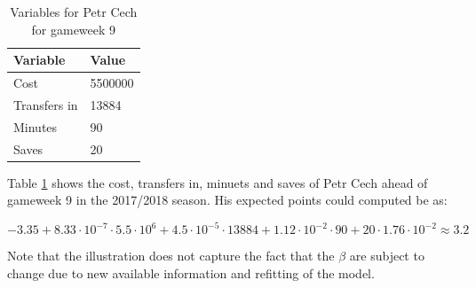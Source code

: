 \begin{table}[H]
\centering
\begin{tabular}{|l|l|}
\hline
Variable     & Value   \\ \hline
Cost         & 5500000 \\
Transfers in & 13884   \\
Minutes      & 90      \\
Saves        & 20     \\
\hline
\end{tabular}
\caption{Variables for Petr Cech for gameweek 9}
\label{tab:var_petr}
\end{table}

Table \ref{tab:var_petr} shows the cost, transfers in, minuets and saves of Petr Cech ahead of gameweek 9 in the 2017/2018 season. His expected points could computed be as:

\begin{equation*}
    -3.35 + 8.33\cdot10^{-7}\cdot5.5\cdot10^6 + 4.5\cdot10^{-5}\cdot13884 + 1.12\cdot10^{-2}\cdot90 + 20\cdot1.76\cdot10^{-2} \approx 3.2
\end{equation*}

Note that the illustration does not capture the fact that the $\beta$ are subject to change due to new available information and refitting of the model.

